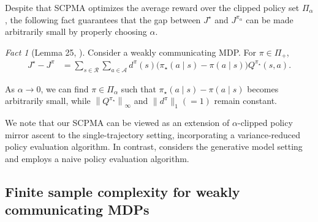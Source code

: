 \documentclass{article}
\theoremstyle{definition}
\theoremstyle{remark}
\newtheorem{fact}{Fact}
\DeclareMathOperator*{\argmin}{argmin}
\newcommand{\cA}{\mathcal{A}}
\newcommand{\cS}{\mathcal{S}}
\newcommand{\cM}{\mathcal{M}}
\newcommand{\cR}{\mathcal{R}}
\newcommand*{\infn}[1]{\left\|{#1}\right\|_{\infty}}
\begin{document}

Despite that SCPMA optimizes the average reward over the clipped policy set $\Pi_\alpha$, the following fact guarantees that the gap between $J^\star$ and $J^{\pi_\alpha}$ can be made arbitrarily small by properly choosing $\alpha$.

\begin{fact}[Lemma 25, \citep{lee2025multi}]\label{fact:per}
Consider a weakly communicating MDP. For $\pi \in \Pi_+$,
\begin{align*}
J^{\star}-J^{\pi} 
&=    \sum_{s \in \cR}
\sum_{a \in \cA}
d^{\pi}(s) \big(\pi_\star(a \mid s)-\pi(a \mid s)\big)Q^{\pi_\star}(s,a). 
\end{align*}    
\end{fact}

 As $\alpha \rightarrow 0$, we can find $\pi \in \Pi_\alpha$ such that $\pi_\star(a \mid s)-\pi(a \mid s)$ becomes arbitrarily small, while $\infn{Q^{\pi_\star}}$ and $\|d^{\pi}\|_1 (=1)$ remain constant. 


We note that our SCPMA can be viewed as an extension of $\alpha$-clipped policy mirror ascent \citep{lee2025multi} to the single-trajectory setting, incorporating a variance-reduced policy evaluation algorithm. In contrast, \citep{lee2025multi} considers the generative model setting and employs a naive policy evaluation algorithm.


\subsection{Finite sample complexity for weakly communicating MDPs}
\end{document}
